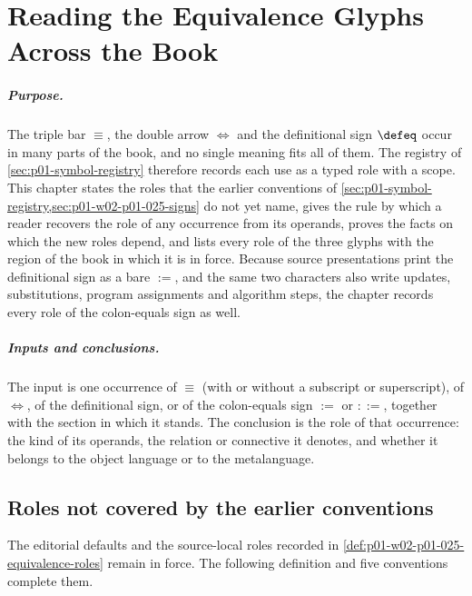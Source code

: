 \chapter{Reading the Equivalence Glyphs Across the Book}
\label{sec:p01-w02b-p01-013-equivalence-audit}

\paragraph{Purpose.}  The triple bar \(\equiv\), the double arrow
\(\Leftrightarrow\) and the definitional sign \(\defeq\) occur in many parts
of the book, and no single meaning fits all of them.  The registry of
\cref{sec:p01-symbol-registry} therefore records each use as a typed role
with a scope.  This chapter states the roles that the earlier conventions of
\cref{sec:p01-symbol-registry,sec:p01-w02-p01-025-signs} do not yet name,
gives the rule by which a reader recovers the role of any occurrence from its
operands, proves the facts on which the new roles depend, and lists every
role of the three glyphs with the region of the book in which it is in force.
Because source presentations print the definitional sign as a bare
\(:=\), and the same two characters also write updates, substitutions,
program assignments and algorithm steps, the chapter records every role of
the colon-equals sign as well.

\paragraph{Inputs and conclusions.}  The input is one occurrence of
\(\equiv\) (with or without a subscript or superscript), of
\(\Leftrightarrow\), of the definitional sign, or of the colon-equals sign
\(:=\) or \(::=\), together with the section in which it stands.  The conclusion is the role of that occurrence: the kind of
its operands, the relation or connective it denotes, and whether it belongs to
the object language or to the metalanguage.

\section{Roles not covered by the earlier conventions}
\label{sec:p01-w02b-p01-013-new-roles}

The editorial defaults and the source-local roles recorded in
\cref{def:p01-w02-p01-025-equivalence-roles} remain in force.  The following
definition and five conventions complete them.

